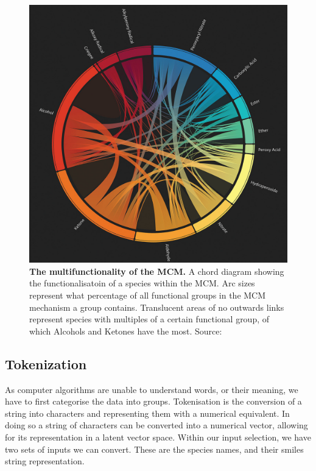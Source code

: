 \begin{figure}[H]
    \centering
    \includegraphics[width=\textwidth]{4fig/coverfig.jpg}
    \caption{\textbf{The multifunctionality of the MCM.} A chord diagram showing the functionalisatoin of a species within the MCM. Arc sizes represent what percentage of all functional groups in the MCM mechanism a group contains. Translucent areas of no outwards links represent species with multiples of a certain functional group, of which Alcohols and Ketones have the most.  
    Source: \citep{cover} }
    \label{fig:covermcm}
\end{figure}



\subsection{Tokenization}
As computer algorithms are unable to understand words, or their meaning, we have to first categorise the data into groups. Tokenisation is the conversion of a string into characters and representing them with a numerical equivalent. In doing so a string of characters can be converted into a numerical vector, allowing for its representation in a latent vector space. 
Within our input selection, we have two sets of inputs we can convert. These are the species names, and their smiles string representation. 



